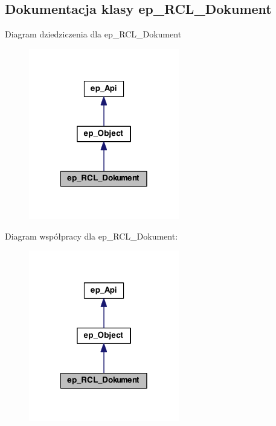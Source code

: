 \hypertarget{classep___r_c_l___dokument}{\subsection{Dokumentacja klasy ep\-\_\-\-R\-C\-L\-\_\-\-Dokument}
\label{classep___r_c_l___dokument}
}


Diagram dziedziczenia dla ep\-\_\-\-R\-C\-L\-\_\-\-Dokument\nopagebreak
\begin{figure}[H]
\begin{center}
\leavevmode
\includegraphics[width=186pt]{classep___r_c_l___dokument__inherit__graph}
\end{center}
\end{figure}


Diagram współpracy dla ep\-\_\-\-R\-C\-L\-\_\-\-Dokument\-:\nopagebreak
\begin{figure}[H]
\begin{center}
\leavevmode
\includegraphics[width=186pt]{classep___r_c_l___dokument__coll__graph}
\end{center}
\end{figure}
